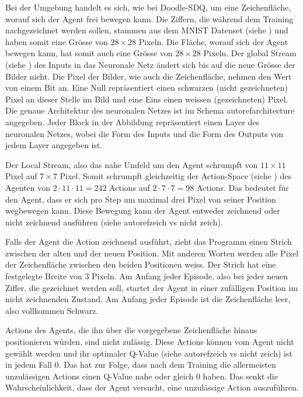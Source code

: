 Bei der Umgebung handelt es sich, wie bei Doodle-SDQ, um eine Zeichenfläche,
worauf sich der Agent frei bewegen kann. Die Ziffern, die während dem Training
nachgezeichnet werden sollen, stammen aus dem MNIST Datenset (siehe
) und haben somit eine Grösse von $28\times28$ Pixeln. Die
Fläche, worauf sich der Agent bewegen   
kann, hat somit auch eine Grösse von $28\times28$ Pixeln. Der global Stream
(siehe ) des Inputs in das Neuronale Netz ändert sich
bis auf die neue Grösse der Bilder nicht. Die Pixel der Bilder, wie auch die
Zeichenfläche, nehmen den Wert von einem Bit an. Eine Null repräsentiert einen
schwarzen (nicht gezeichneten) Pixel an dieser Stelle im Bild und eine Eins
einen weissen (gezeichneten) Pixel. Die genaue Architektur des neuronalen Netzes
ist im Schema autoref{architecture} angegeben. Jeder Block in der Abbildung
repräsentiert einen Layer des neuronalen Netzes, wobei die Form des Inputs und
die Form des Outputs von jedem Layer angegeben ist. 


Der Local Stream, also das nahe Umfeld um den Agent schrumpft von $11\times11$
Pixel auf $7\times7$ Pixel. Somit schrumpft gleichzeitig der Action-Space (siehe
) des Agenten von $2\cdot11\cdot11 = 242$ Actions auf
$2\cdot7\cdot7 = 98$ Actions. Das bedeutet für den Agent, dass er sich pro Step
um maximal drei Pixel von seiner Position wegbewegen kann. Diese Bewegung kann
der Agent entweder zeichnend oder nicht zeichnend ausführen (siehe autoref{zeich
vs nicht zeich}).


Falls der Agent die Action zeichnend ausführt, zieht das Programm einen Strich
zwischen der alten und der neuen Position. Mit anderen Worten werden alle Pixel
der Zeichenfläche zwischen den beiden Positionen weiss. Der Strich hat eine
festgelegte Breite von $3$ Pixeln. Am Anfang jeder Episode, also bei jeder neuen
Ziffer, die gezeichnet werden soll, startet der Agent in einer zufälligen
Position im nicht zeichnenden Zustand. Am Anfang jeder Episode ist die
Zeichenfläche leer, also vollkommen Schwarz.

Actions des Agents, die ihn über die vorgegebene Zeichenfläche hinaus
positionieren würden, sind nicht zulässig. Diese Actions können vom Agent nicht
gewählt werden und ihr optimaler Q-Value (siehe autoref{zeich vs nicht zeich})
ist in jedem Fall $0$. Das hat zur Folge, dass nach dem Training die
allermeisten unzulässigen Actions einen Q-Value nahe oder gleich $0$ haben. Das
senkt die Wahrscheinlichkeit, dass der Agent versucht, eine unzulässige Action
auszuführen.


